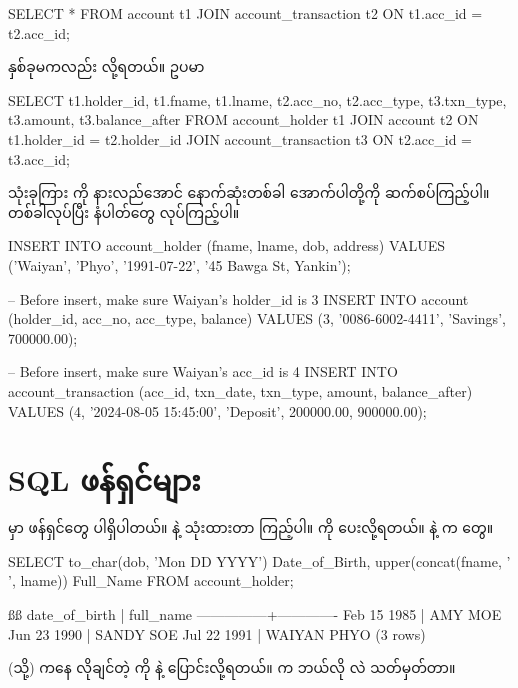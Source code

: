 %
\begin{sql}
SELECT 
    *
FROM account t1 JOIN account_transaction t2
    ON t1.acc_id = t2.acc_id;
\end{sql}
%
 နှစ်ခုမကလည်း  လို့ရတယ်။ ဥပမာ 
%
\begin{sql}
SELECT 
    t1.holder_id,
    t1.fname,
    t1.lname,
    t2.acc_no,
    t2.acc_type,
    t3.txn_type,
    t3.amount,
    t3.balance_after
FROM account_holder t1 JOIN account t2
    ON t1.holder_id = t2.holder_id
JOIN account_transaction t3
    ON t2.acc_id = t3.acc_id;
\end{sql}
%

 သုံးခုကြား  ကို နားလည်အောင် နောက်ဆုံးတစ်ခါ အောက်ပါတို့ကို ဆက်စပ်ကြည့်ပါ။  တစ်ခါလုပ်ပြီး  နံပါတ်တွေ  လုပ်ကြည့်ပါ။
%
\begin{sql}
INSERT INTO account_holder (fname, lname, dob, address)
VALUES 
('Waiyan', 'Phyo', '1991-07-22', '45 Bawga St, Yankin');
\end{sql}
%
%
\begin{sql}
-- Before insert, make sure Waiyan's holder_id is 3
INSERT INTO account (holder_id, acc_no, acc_type, balance)
VALUES 
(3, '0086-6002-4411', 'Savings', 700000.00);
\end{sql}
%

%
\begin{sql}
-- Before insert, make sure Waiyan's acc_id is 4
INSERT INTO account_transaction 
    (acc_id, txn_date, txn_type, amount, balance_after)
VALUES 
    (4, '2024-08-05 15:45:00', 'Deposit', 200000.00, 900000.00);
\end{sql}
%


\section{SQL ဖန်ရှင်များ}
 မှာ  ဖန်ရှင်တွေ ပါရှိပါတယ်။ \fEn{,}  နဲ့  သုံးထားတာ ကြည့်ပါ။  ကို  ပေးလို့ရတယ်။  နဲ့  က  တွေ။
%
\begin{sql}
SELECT
    to_char(dob, 'Mon DD YYYY') Date_of_Birth,
    upper(concat(fname, ' ', lname)) Full_Name
FROM account_holder;
\end{sql}
%
%
\begin{vbtm}
ßß
 date_of_birth |  full_name
---------------+-------------
 Feb 15 1985   | AMY MOE
 Jun 23 1990   | SANDY SOE
 Jul 22 1991   | WAIYAN PHYO
(3 rows)
\end{vbtm}
%
  (သို့)   ကနေ လိုချင်တဲ့  ကို  နဲ့ ပြောင်းလို့ရတယ်။  က ဘယ်လို  လဲ သတ်မှတ်တာ။







